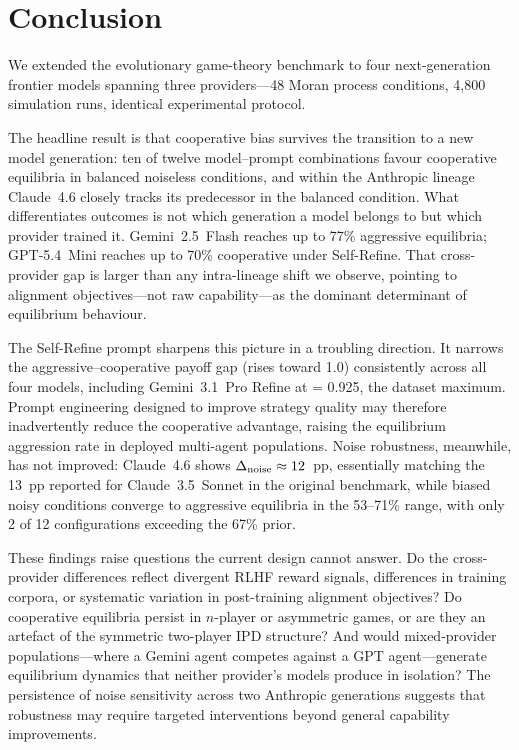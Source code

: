 \section{Conclusion}
\label{sec:conclusion}

We extended the \citet{Willis2025_llm_ipd} \LLM evolutionary
game-theory benchmark to four next-generation frontier models spanning three
providers---48 Moran process conditions, 4,800 simulation runs, identical
experimental protocol.

The headline result is that cooperative bias survives the transition to a new
model generation: ten of twelve model--prompt combinations favour cooperative
equilibria in balanced noiseless conditions, and within the Anthropic lineage
Claude~4.6 closely tracks its predecessor in the balanced condition.
What differentiates outcomes is not which generation a model belongs to but
which provider trained it. Gemini~2.5~Flash reaches up to 77\% aggressive
equilibria; GPT-5.4~Mini reaches up to 70\% cooperative under Self-Refine.
That cross-provider gap is larger than any intra-lineage shift we observe,
pointing to alignment objectives---not raw capability---as the dominant
determinant of equilibrium behaviour.

The Self-Refine prompt sharpens this picture in a troubling direction.
It narrows the aggressive--cooperative payoff gap (\ICD rises toward 1.0)
consistently across all four models, including Gemini~3.1~Pro Refine at \ICD = 0.925, the dataset maximum.
Prompt engineering designed to improve strategy quality may therefore
inadvertently reduce the cooperative advantage, raising the equilibrium
aggression rate in deployed multi-agent populations.
Noise robustness, meanwhile, has not improved: Claude~4.6 shows
$\Delta_{\mathrm{noise}} \approx 12$~pp, essentially matching the 13~pp
reported for Claude~3.5~Sonnet in the original benchmark, while biased noisy
conditions converge to aggressive equilibria in the 53--71\% range,
with only 2 of 12 configurations exceeding the 67\% prior.

These findings raise questions the current design cannot answer.
Do the cross-provider differences reflect divergent RLHF reward signals,
differences in training corpora, or systematic variation in post-training
alignment objectives? Do cooperative equilibria persist in $n$-player or
asymmetric games, or are they an artefact of the symmetric two-player IPD
structure? And would mixed-provider populations---where a Gemini agent
competes against a GPT agent---generate equilibrium dynamics that neither
provider's models produce in isolation? The persistence of noise sensitivity
across two Anthropic generations suggests that robustness may require
targeted interventions beyond general capability improvements.

